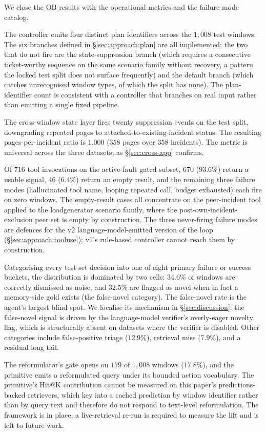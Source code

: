 We close the OB results with the operational metrics and the failure-mode catalog.

 The controller emits four distinct plan identifiers across the $1{,}008$ \dsob{} test windows. The six branches defined in \S\ref{sec:approach:plan} are all implemented; the two that do not fire are the state-suppression branch (which requires a consecutive ticket-worthy sequence on the same scenario family without recovery, a pattern the locked test split does not surface frequently) and the default branch (which catches unrecognised window types, of which the split has none). The plan-identifier count is consistent with a controller that branches on real input rather than emitting a single fixed pipeline.

 The cross-window state layer fires twenty suppression events on the test split, downgrading repeated pages to attached-to-existing-incident status. The resulting pages-per-incident ratio is $1.000$ ($358$ pages over $358$ incidents). The metric is universal across the three datasets, as \S\ref{sec:cross-app} confirms.

 Of $716$ tool invocations on the active-fault gated subset, $670$ ($93.6\%$) return a usable signal, $46$ ($6.4\%$) return an empty result, and the remaining three failure modes (hallucinated tool name, looping repeated call, budget exhausted) each fire on zero windows. The empty-result cases all concentrate on the peer-incident tool applied to the loadgenerator scenario family, where the post-own-incident-exclusion peer set is empty by construction. The three never-firing failure modes are defences for the v2 language-model-emitted version of the loop (\S\ref{sec:approach:tooluse}); v1's rule-based controller cannot reach them by construction.

 Categorising every test-set decision into one of eight primary failure or success buckets, the distribution is dominated by two cells: $34.6\%$ of windows are correctly dismissed as noise, and $32.5\%$ are flagged as novel when in fact a memory-side gold exists (the false-novel category). The false-novel rate is the agent's largest blind spot. We localise its mechanism in \S\ref{sec:discussion}: the false-novel signal is driven by the language-model verifier's overly-eager novelty flag, which is structurally absent on datasets where the verifier is disabled. Other categories include false-positive triage ($12.9\%$), retrieval miss ($7.9\%$), and a residual long tail.

 The reformulator's gate opens on $179$ of $1{,}008$ windows ($17.8\%$), and the primitive emits a reformulated query under its bounded action vocabulary. The primitive's Hit@K contribution cannot be measured on this paper's predictions-backed retrievers, which key into a cached prediction by window identifier rather than by query text and therefore do not respond to text-level reformulation. The framework is in place; a live-retrieval re-run is required to measure the lift and is left to future work.
